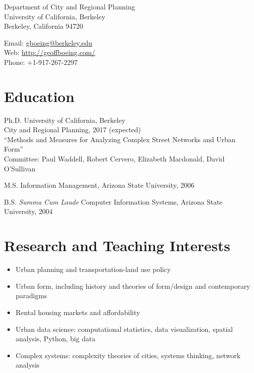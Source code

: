 \documentclass{academiccv}
\begin{document}
\raggedright

\namefont{\myname}

\vspace{1em}
\begin{minipage}[t]{0.495\textwidth}
  Department of City and Regional Planning \\
  University of California, Berkeley \\
  Berkeley, California 94720
\end{minipage}
\begin{minipage}[t]{0.495\textwidth}
  Email: \href{mailto:gboeing@berkeley.edu}{gboeing@berkeley.edu} \\
  Web: \href{http://geoffboeing.com/}{http://geoffboeing.com/} \\
  Phone: +1-917-267-2297
\end{minipage}
\vspace{0.5em}



\section*{Education}

\begin{tablist}
\item[Ph.D.] \tab University of California, Berkeley \\
                  City and Regional Planning, 2017 (expected) \\
                  \enquote{Methods and Measures for Analyzing Complex Street Networks and Urban Form} \\
                  Committee: Paul Waddell, Robert Cervero, Elizabeth Macdonald, David O'Sullivan
\item[M.S.]  \tab Information Management, Arizona State University, 2006
\item[B.S.]  \tab \emph{Summa Cum Laude} Computer Information Systems, Arizona State University, 2004
\end{tablist}



\section*{Research and Teaching Interests}

\begin{itemize}
\item Urban planning and transportation-land use policy
\item Urban form, including history and theories of form/design and contemporary paradigms
\item Rental housing markets and affordability
\item Urban data science: computational statistics, data visualization, spatial analysis, Python, big data
\item Complex systems: complexity theories of cities, systems thinking, network analysis
\end{itemize}
\end{document}
